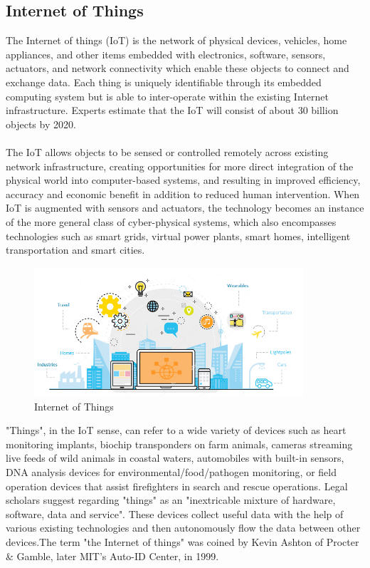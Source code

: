 \documentclass[twoside,a4paper,16pt]{book}
\begin{document}
{{			\subsection{Internet of Things}
			The Internet of things (IoT) is the network of physical devices, vehicles, home appliances, and other items embedded with electronics, software, sensors, actuators, and network connectivity which enable these objects to connect and exchange data. Each thing is uniquely identifiable through its embedded computing system but is able to inter-operate within the existing Internet infrastructure. Experts estimate that the IoT will consist of about 30 billion objects by 2020.\\\\
			The IoT allows objects to be sensed or controlled remotely across existing network infrastructure, creating opportunities for more direct integration of the physical world into computer-based systems, and resulting in improved efficiency, accuracy and economic benefit in addition to reduced human intervention. When IoT is augmented with sensors and actuators, the technology becomes an instance of the more general class of cyber-physical systems, which also encompasses technologies such as smart grids, virtual power plants, smart homes, intelligent transportation and smart cities.
			\begin{figure}[ht!]
				\begin{center}
					\includegraphics[width=10.0cm]{5.jpg}
					\caption{Internet of Things}
				\end{center}
			\end{figure}
			"Things", in the IoT sense, can refer to a wide variety of devices such as heart monitoring implants, biochip transponders on farm animals, cameras streaming live feeds of wild animals in coastal waters, automobiles with built-in sensors, DNA analysis devices for environmental/food/pathogen monitoring, or field operation devices that assist firefighters in search and rescue operations. Legal scholars suggest regarding "things" as an "inextricable mixture of hardware, software, data and service".
			These devices collect useful data with the help of various existing technologies and then autonomously flow the data between other devices.The term "the Internet of things" was coined by Kevin Ashton of Procter \& Gamble, later MIT's Auto-ID Center, in 1999.
}}
\end{document}

